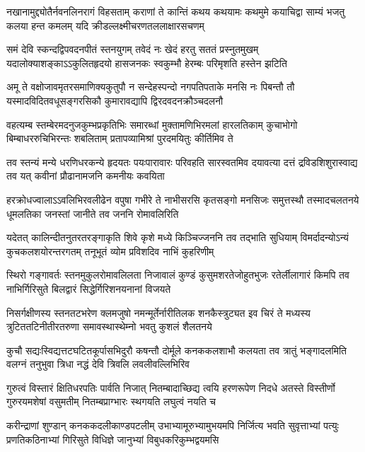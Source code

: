 \fourlineindentedshloka
{नखानामुद्द्योतैर्नवनलिनरागं विहसताम्}
{कराणां ते कान्तिं कथय कथयामः कथमुमे}
{कयाचिद्वा साम्यं भजतु कलया हन्त कमलम्}
{यदि क्रीडल्लक्ष्मीचरणतललाक्षारसचणम्}%

\fourlineindentedshloka
{समं देवि स्कन्दद्विपवदनपीतं स्तनयुगम्}
{तवेदं नः खेदं हरतु सततं प्रस्नुतमुखम्}
{यदालोक्याशङ्काऽऽकुलितहृदयो हासजनकः}
{स्वकुम्भौ हेरम्बः परिमृशति हस्तेन झटिति}%

\fourlineindentedshloka
{अमू ते वक्षोजावमृतरसमाणिक्यकुतुपौ}
{न सन्देहस्पन्दो नगपतिपताके मनसि नः}
{पिबन्तौ तौ यस्मादविदितवधूसङ्गरसिकौ}
{कुमारावद्यापि द्विरदवदनक्रौञ्चदलनौ}%

\fourlineindentedshloka
{वहत्यम्ब स्तम्बेरमदनुजकुम्भप्रकृतिभिः}
{समारब्धां मुक्तामणिभिरमलां हारलतिकाम्}
{कुचाभोगो बिम्बाधररुचिभिरन्तः शबलिताम्}
{प्रतापव्यामिश्रां पुरदमयितुः कीर्तिमिव ते}%

\fourlineindentedshloka
{तव स्तन्यं मन्ये धरणिधरकन्ये हृदयतः}
{पयःपारावारः परिवहति सारस्वतमिव}
{दयावत्या दत्तं द्रविडशिशुरास्वाद्य तव यत्}
{कवीनां प्रौढानामजनि कमनीयः कवयिता}%

\fourlineindentedshloka
{हरक्रोधज्वालाऽऽवलिभिरवलीढेन वपुषा}
{गभीरे ते नाभीसरसि कृतसङ्गो मनसिजः}
{समुत्तस्थौ तस्मादचलतनये धूमलतिका}
{जनस्तां जानीते तव जननि रोमावलिरिति}%

\fourlineindentedshloka
{यदेतत् कालिन्दीतनुतरतरङ्गाकृति शिवे}
{कृशे मध्ये किञ्चिज्जननि तव तद्भाति सुधियाम्}
{विमर्दादन्योऽन्यं कुचकलशयोरन्तरगतम्}
{तनूभूतं व्योम प्रविशदिव नाभिं कुहरिणीम्}%

\fourlineindentedshloka
{स्थिरो गङ्गावर्तः स्तनमुकुलरोमावलिलता}
{निजावालं कुण्डं कुसुमशरतेजोहुतभुजः}
{रतेर्लीलागारं किमपि तव नाभिर्गिरिसुते}
{बिलद्वारं सिद्धेर्गिरिशनयनानां विजयते}%

\fourlineindentedshloka
{निसर्गक्षीणस्य स्तनतटभरेण क्लमजुषो}
{नमन्मूर्तेर्नारीतिलक शनकैस्त्रुट्यत इव}
{चिरं ते मध्यस्य त्रुटिततटिनीतीरतरुणा}
{समावस्थास्थेम्नो भवतु कुशलं शैलतनये}%

\fourlineindentedshloka
{कुचौ सद्यःस्विद्यत्तटघटितकूर्पासभिदुरौ}
{कषन्तौ दोर्मूले कनककलशाभौ कलयता}
{तव त्रातुं भङ्गादलमिति वलग्नं तनुभुवा}
{त्रिधा नद्धं देवि त्रिवलि लवलीवल्लिभिरिव}%

\fourlineindentedshloka
{गुरुत्वं विस्तारं क्षितिधरपतिः पार्वति निजात्}
{नितम्बादाच्छिद्य त्वयि हरणरूपेण निदधे}
{अतस्ते विस्तीर्णो गुरुरयमशेषां वसुमतीम्}
{नितम्बप्राग्भारः स्थगयति लघुत्वं नयति च}%

\fourlineindentedshloka
{करीन्द्राणां शुण्डान् कनककदलीकाण्डपटलीम्}
{उभाभ्यामूरुभ्यामुभयमपि निर्जित्य भवति}
{सुवृत्ताभ्यां पत्युः प्रणतिकठिनाभ्यां गिरिसुते}
{विधिज्ञे जानुभ्यां विबुधकरिकुम्भद्वयमसि}%

